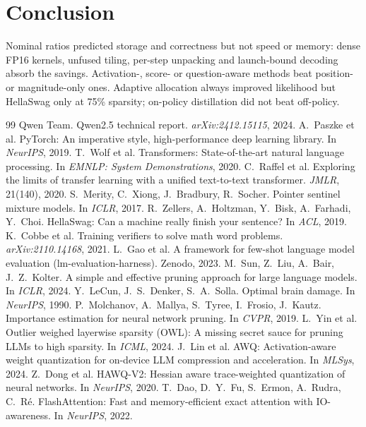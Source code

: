 \documentclass{article}
\begin{document}
\FloatBarrier
\section{Conclusion}
Nominal ratios predicted storage and correctness but not speed or memory: dense FP16 kernels, unfused tiling, per-step unpacking and launch-bound decoding absorb the savings. Activation-, score- or question-aware methods beat position- or magnitude-only ones. Adaptive allocation always improved likelihood but HellaSwag only at 75\% sparsity; on-policy distillation did not beat off-policy.

\small
\begin{thebibliography}{99}
 Qwen Team. Qwen2.5 technical report. \emph{arXiv:2412.15115}, 2024.
 A.~Paszke et al. PyTorch: An imperative style, high-performance deep learning library. In \emph{NeurIPS}, 2019.
 T.~Wolf et al. Transformers: State-of-the-art natural language processing. In \emph{EMNLP: System Demonstrations}, 2020.
 C.~Raffel et al. Exploring the limits of transfer learning with a unified text-to-text transformer. \emph{JMLR}, 21(140), 2020.
 S.~Merity, C.~Xiong, J.~Bradbury, R.~Socher. Pointer sentinel mixture models. In \emph{ICLR}, 2017.
 R.~Zellers, A.~Holtzman, Y.~Bisk, A.~Farhadi, Y.~Choi. HellaSwag: Can a machine really finish your sentence? In \emph{ACL}, 2019.
 K.~Cobbe et al. Training verifiers to solve math word problems. \emph{arXiv:2110.14168}, 2021.
 L.~Gao et al. A framework for few-shot language model evaluation (lm-evaluation-harness). Zenodo, 2023.
 M.~Sun, Z.~Liu, A.~Bair, J.~Z.~Kolter. A simple and effective pruning approach for large language models. In \emph{ICLR}, 2024.
 Y.~LeCun, J.~S.~Denker, S.~A.~Solla. Optimal brain damage. In \emph{NeurIPS}, 1990.
 P.~Molchanov, A.~Mallya, S.~Tyree, I.~Frosio, J.~Kautz. Importance estimation for neural network pruning. In \emph{CVPR}, 2019.
 L.~Yin et al. Outlier weighed layerwise sparsity (OWL): A missing secret sauce for pruning LLMs to high sparsity. In \emph{ICML}, 2024.
 J.~Lin et al. AWQ: Activation-aware weight quantization for on-device LLM compression and acceleration. In \emph{MLSys}, 2024.
 Z.~Dong et al. HAWQ-V2: Hessian aware trace-weighted quantization of neural networks. In \emph{NeurIPS}, 2020.
 T.~Dao, D.~Y.~Fu, S.~Ermon, A.~Rudra, C.~R\'e. FlashAttention: Fast and memory-efficient exact attention with IO-awareness. In \emph{NeurIPS}, 2022.

\end{thebibliography}
\end{document}
